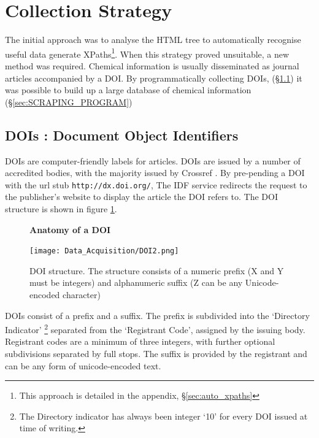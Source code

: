 \section{Collection Strategy}
The initial approach was to analyse the HTML tree to automatically recognise useful data generate XPaths\footnote{This approach is detailed in the appendix, \S\ref{sec:auto_xpaths}}. When this strategy proved unsuitable, a new method was required. Chemical information is usually disseminated as journal articles accompanied by a DOI. By programmatically collecting DOIs, (\S\ref{sec:DOI}) it was possible to build up a large database of chemical information (\S\ref{sec:SCRAPING_PROGRAM})
\subsection{DOIs : Document Object Identifiers}
\label{sec:DOI}
DOIs are computer-friendly labels for articles. DOIs are issued by a number of accredited bodies, with the majority issued by Crossref \cite{crossref-formation}. By pre-pending a DOI with the url stub \texttt{http://dx.doi.org/}, The IDF service redirects the request to the publisher's website to display the article the DOI refers to. The DOI structure is shown in figure \ref{fig:DOI}.
\begin{figure}[H]
    \centering
    \textbf{Anatomy of a DOI}\par\medskip
    \texttt{[image: Data\_Acquisition/DOI2.png]}
    \caption[Anatomy of a DOI]{DOI structure. The structure consists of a numeric prefix (X and Y must be integers) and alphanumeric suffix (Z can be any Unicode-encoded character)} \label{fig:DOI}
\end{figure}
DOIs consist of a prefix and a suffix. The prefix is subdivided into the ‘Directory Indicator’ \footnote{The Directory indicator has always been integer ‘10’ for every DOI issued at time of writing.} separated from the ‘Registrant Code’, assigned by the issuing body\cite{doi_handbook1}. Registrant codes are a minimum of three integers, with further optional subdivisions separated by full stops. The suffix is provided by the registrant and can be any form of unicode-encoded text\cite{doi_handbook1}.

